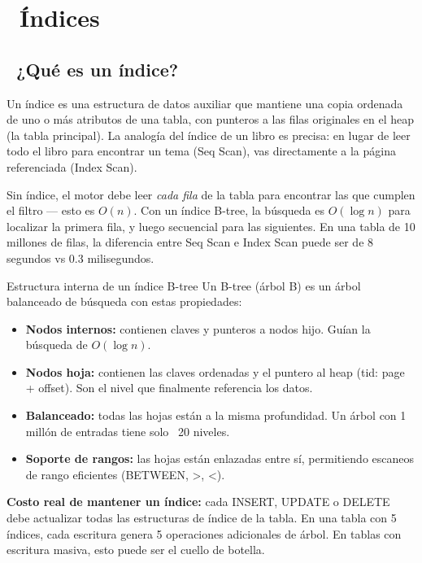 \chapter[Índices]{~Índices}

\section[¿Qué es un índice?]{~¿Qué es un índice?}

Un índice es una estructura de datos auxiliar que mantiene una copia ordenada de uno o más atributos de una tabla, con punteros a las filas originales en el heap (la tabla principal).
La analogía del índice de un libro es precisa: en lugar de leer todo el libro para encontrar un tema (Seq Scan), vas directamente a la página referenciada (Index Scan).

Sin índice, el motor debe leer \emph{cada fila} de la tabla para encontrar las que cumplen el filtro — esto es $O(n)$.
Con un índice B-tree, la búsqueda es $O(\log n)$ para localizar la primera fila, y luego secuencial para las siguientes.
En una tabla de 10 millones de filas, la diferencia entre Seq Scan e Index Scan puede ser de 8 segundos vs 0.3 milisegundos.

\begin{teoriabox}{Estructura interna de un índice B-tree}
Un B-tree (árbol B) es un árbol balanceado de búsqueda con estas propiedades:
\begin{itemize}
  \item \textbf{Nodos internos:} contienen claves y punteros a nodos hijo. Guían la búsqueda de $O(\log n)$.
  \item \textbf{Nodos hoja:} contienen las claves ordenadas y el puntero al heap (tid: page + offset). Son el nivel que finalmente referencia los datos.
  \item \textbf{Balanceado:} todas las hojas están a la misma profundidad. Un árbol con 1 millón de entradas tiene solo ~20 niveles.
  \item \textbf{Soporte de rangos:} las hojas están enlazadas entre sí, permitiendo escaneos de rango eficientes (BETWEEN, >, <).
\end{itemize}
\textbf{Costo real de mantener un índice:}
cada INSERT, UPDATE o DELETE debe actualizar todas las estructuras de índice de la tabla.
En una tabla con 5 índices, cada escritura genera 5 operaciones adicionales de árbol.
En tablas con escritura masiva, esto puede ser el cuello de botella.
\end{teoriabox}

